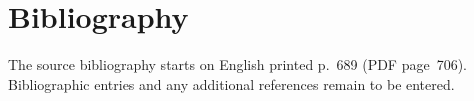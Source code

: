 \chapter*{Bibliography}
The source bibliography starts on English printed p.~689 (PDF page~706). Bibliographic entries and any additional references remain to be entered.

\PDEPending
